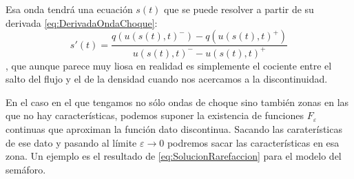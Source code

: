 Esa onda tendrá una ecuación $s(t)$ que se puede resolver a partir de su derivada \eqref{eq:DerivadaOndaChoque}: \[ s'(t) = \frac{q(u(s(t),t)^{-}) - q(u(s(t),t)^{+})}{u(s(t),t)^{-} - u(s(t),t)^{+}} \], que aunque parece muy liosa en realidad es simplemente el cociente entre el salto del flujo y el de la densidad cuando nos acercamos a la discontinuidad.

En el caso en el que tengamos no sólo ondas de choque sino también zonas en las que no hay características, podemos suponer la existencia de funciones $F_ε$ continuas que aproximan la función dato discontinua. Sacando las caraterísticas de ese dato y pasando al límite $ε \to 0$ podremos sacar las características en esa zona. Un ejemplo es el resultado de \eqref{eq:SolucionRarefaccion} para el modelo del semáforo.
